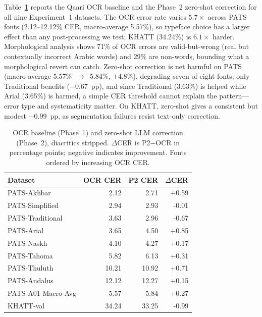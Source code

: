 \documentclass[conference]{IEEEtran}
\begin{document}
Table~\ref{tab:phase12} reports the Qaari OCR baseline and the Phase~2 zero-shot
correction for all nine Experiment~1 datasets. The OCR error rate varies
$5.7\times$ across PATS fonts (2.12--12.12\% CER, macro-average 5.57\%), so
typeface choice has a larger effect than any post-processing we test; KHATT
(34.24\%) is $6.1\times$ harder. Morphological analysis shows 71\% of OCR errors
are valid-but-wrong (real but contextually incorrect Arabic words) and 29\% are
non-words, bounding what a morphological revert can catch. Zero-shot correction
is net harmful on PATS (macro-average 5.57\%~$\to$~5.84\%, $+$4.8\%), degrading
seven of eight fonts; only Traditional benefits ($-$0.67~pp), and since
Traditional (3.63\%) is helped while Arial (3.65\%) is harmed, a simple CER
threshold cannot explain the pattern---error type and systematicity matter.
On KHATT, zero-shot gives a consistent but modest $-$0.99~pp, as segmentation
failures resist text-only correction.

\begin{table}[t]
\caption{OCR baseline (Phase~1) and zero-shot LLM correction (Phase~2),
diacritics stripped. $\Delta$CER is P2$-$OCR in percentage points; negative
indicates improvement. Fonts ordered by increasing OCR CER.}
\label{tab:phase12}
\begin{center}
\small
\begin{tabular}{lrrr}
\toprule
\textbf{Dataset} & \textbf{OCR CER} & \textbf{P2 CER} & \textbf{$\Delta$CER} \\
\midrule
PATS-Akhbar       &  2.12 &  2.71 & +0.59 \\
PATS-Simplified   &  2.94 &  2.93 & -0.01 \\
PATS-Traditional  &  3.63 &  2.96 & -0.67 \\
PATS-Arial        &  3.65 &  4.50 & +0.85 \\
PATS-Naskh        &  4.10 &  4.27 & +0.17 \\
PATS-Tahoma       &  5.82 &  6.13 & +0.31 \\
PATS-Thuluth      & 10.21 & 10.92 & +0.71 \\
PATS-Andalus      & 12.12 & 12.27 & +0.15 \\
PATS-A01 Macro-Avg&  5.57 &  5.84 & +0.27 \\
\midrule
KHATT-val         & 34.24 & 33.25 & -0.99 \\
\bottomrule
\end{tabular}
\end{center}
\end{table}
\end{document}
